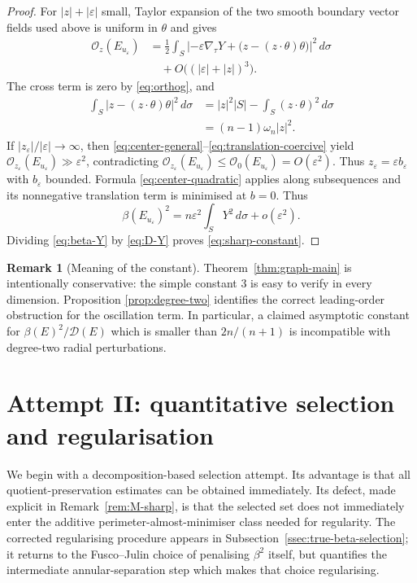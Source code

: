 \documentclass[11pt]{amsart}
\theoremstyle{definition}
\newtheorem{remark}[theorem]{Remark}
\newcommand{\eps}{\varepsilon}
\newcommand{\osc}{\mathcal O}
\newcommand{\Def}{\mathcal D}
\begin{document}
\begin{proof}
For \(|z|+|\eps|\) small, Taylor expansion of the two smooth boundary vector
fields used above is uniform in \(\theta\) and gives
\[
\begin{aligned}
   \osc_z(E_{u_\eps})
   &=
   \frac12\int_S
      \left|-\eps\nabla_\tau Y+
       \bigl(z-(z\cdot\theta)\theta\bigr)\right|^2\,d\sigma \\
   &\quad+O\bigl((|\eps|+|z|)^3\bigr).
\end{aligned}
\tag{3.59}\label{eq:center-general}
\]
The cross term is zero by \eqref{eq:orthog}, and
\[
\begin{aligned}
   \int_S\left|z-(z\cdot\theta)\theta\right|^2\,d\sigma
   &=|z|^2|S|-\int_S(z\cdot\theta)^2\,d\sigma \\
   &=(n-1)\omega_n|z|^2.
\end{aligned}
\tag{3.60}\label{eq:translation-coercive}
\]
If \(|z_\eps|/|\eps|\to\infty\), then
\eqref{eq:center-general}--\eqref{eq:translation-coercive} yield
\(\osc_{z_\eps}(E_{u_\eps})\gg\eps^2\), contradicting
\(\osc_{z_\eps}(E_{u_\eps})\le\osc_0(E_{u_\eps})=O(\eps^2)\).
Thus \(z_\eps=\eps b_\eps\) with \(b_\eps\) bounded.  Formula
\eqref{eq:center-quadratic} applies along subsequences and its nonnegative
translation term is minimised at \(b=0\).
Thus
\[
   \beta(E_{u_\eps})^2
   =n\eps^2\int_SY^2\,d\sigma+o(\eps^2).
\tag{3.61}\label{eq:beta-Y}
\]
Dividing \eqref{eq:beta-Y} by \eqref{eq:D-Y} proves
\eqref{eq:sharp-constant}.
\end{proof}

\begin{remark}[Meaning of the constant]\label{rem:constant}
Theorem~\ref{thm:graph-main} is intentionally conservative: the simple
constant \(3\) is easy to verify in every dimension.  Proposition
\ref{prop:degree-two} identifies the correct leading-order obstruction for
the oscillation term.  In particular, a claimed asymptotic constant for
\(\beta(E)^2/\Def(E)\) which is smaller than \(2n/(n+1)\) is incompatible with
degree-two radial perturbations.
\end{remark}

\section{Attempt II: quantitative selection and regularisation}
\label{sec:selection}

We begin with a decomposition-based selection attempt.  Its advantage is
that all quotient-preservation estimates can be obtained immediately.  Its
defect, made explicit in Remark~\ref{rem:M-sharp}, is that the selected set
does not immediately enter the additive perimeter-almost-minimiser class
needed for regularity.  The corrected regularising procedure appears in
Subsection~\ref{ssec:true-beta-selection}; it returns to the Fusco--Julin
choice of penalising \(\beta^2\) itself, but quantifies the intermediate
annular-separation step which makes that choice regularising.
\end{document}
